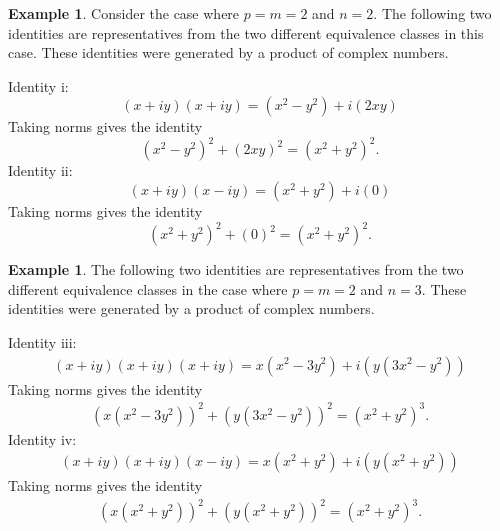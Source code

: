 \documentclass[12pt]{article}
\theoremstyle{definition}
\newtheorem{example}[theorem]{Example}
\numberwithin{equation}{section}
\begin{document}
\begin{example}

Consider the case where \( p = m = 2 \) and \( n = 2\).
The following two identities are representatives from 
the two different equivalence classes in this case. These identities
were generated by a product of complex numbers. 

\noindent
Identity i:
\begin{equation*}
(x + iy)(x + iy) = (x^2 - y^2 ) + i(2xy) 
\end{equation*}
Taking norms gives the identity
\begin{equation}
    (x^2 - y^2 )^2 + (2xy)^2 
    = (x^2 + y^2)^2.
\end{equation}
Identity ii:
\begin{equation*}
    (x + iy )(x - iy )
    = (x^2 + y^2 ) + i(0)  
\end{equation*}
Taking norms gives the identity
\begin{equation}
    (x^2 + y^2 )^2 + (0)^2
    = (x^2 + y^2 )^2.
\end{equation}
\end{example}



\begin{example}
The following two identities are representatives from 
the two different equivalence classes in the
case where \( p = m = 2 \) and \( n = 3\).
These identities
were generated by a product of complex numbers. 

\noindent
Identity iii:
\begin{align*}
    (x + iy)(x + iy)(x + iy) 
    = x(x^2 - 3y^2) + i(  y(3x^2 - y^2) )  
    \end{align*}
Taking norms gives the identity
    \begin{align}
    (x(x^2 - 3y^2))^2 + (  y(3x^2 - y^2) )^2  
    = (x^2 + y^2)^3.
    \end{align}
Identity iv:
    \begin{align*}
    (x + iy )(x + iy)(x - iy ) 
    = x(x^2 + y^2 ) + i(y(x^2 + y^2))  
    \end{align*}
Taking norms gives the identity
    \begin{align}
    ( x(x^2 + y^2) )^2 + ( y(x^2 + y^2) )^2 
    = (x^2 + y^2 )^3.
    \end{align}
\end{example}
\end{document}
